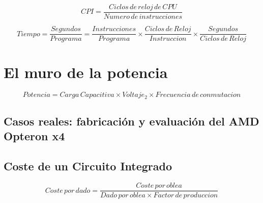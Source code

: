 \documentclass[12pt]{article}
\begin{document}
\begin{equation}
    CPI = \frac{Ciclos\hspace{2pt}de\hspace{2pt}reloj\hspace{2pt}de\hspace{2pt}CPU}{Numero\hspace{2pt}de\hspace{2pt}instrucciones}
\end{equation}

\begin{equation}
    Tiempo = \frac{Segundos}{Programa} = \frac{Instrucciones}{Programa} \times \frac{Ciclos\hspace{2pt}de\hspace{2pt}Reloj}{Instruccion} \times \frac{Segundos}{Ciclos\hspace{2pt}de\hspace{2pt}Reloj}
\end{equation}

\section*{El muro de la potencia}

\begin{equation}
    Potencia = Carga\hspace{2pt}Capacitiva \times Voltaje_2 \times Frecuencia\hspace{2pt}de\hspace{2pt}conmutacion
\end{equation}

\subsection*{Casos reales: fabricación y evaluación del AMD Opteron x4 }
\subsection*{Coste de un Circuito Integrado}

\begin{equation}
    Coste\hspace{2pt}por\hspace{2pt}dado = \frac{Coste\hspace{2pt}por\hspace{2pt}oblea}{Dado\hspace{2pt}por\hspace{2pt}oblea \times Factor\hspace{2pt}de\hspace{2pt}produccion}
\end{equation}
\end{document}
